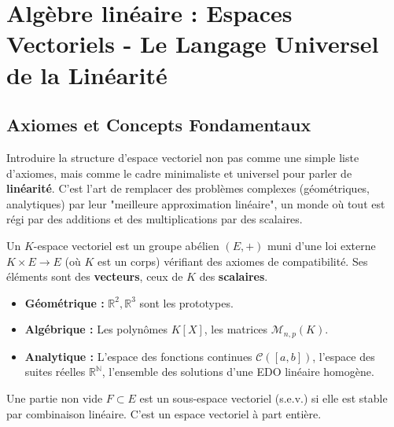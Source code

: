 \chapter{Algèbre linéaire : Espaces Vectoriels - Le Langage Universel de la Linéarité}

\section{Axiomes et Concepts Fondamentaux}

\begin{objectif}
    Introduire la structure d'espace vectoriel non pas comme une simple liste d'axiomes, mais comme le cadre minimaliste et universel pour parler de \textbf{linéarité}. C'est l'art de remplacer des problèmes complexes (géométriques, analytiques) par leur "meilleure approximation linéaire", un monde où tout est régi par des additions et des multiplications par des scalaires.
\end{objectif}

\begin{definition}
    Un $K$-espace vectoriel est un groupe abélien $(E, +)$ muni d'une loi externe $K \times E \to E$ (où $K$ est un corps) vérifiant des axiomes de compatibilité. Ses éléments sont des \textbf{vecteurs}, ceux de $K$ des \textbf{scalaires}.
\end{definition}

\begin{example}
    \begin{itemize}
        \item \textbf{Géométrique :} $\mathbb{R}^2, \mathbb{R}^3$ sont les prototypes.
        \item \textbf{Algébrique :} Les polynômes $K[X]$, les matrices $\mathcal{M}_{n,p}(K)$.
        \item \textbf{Analytique :} L'espace des fonctions continues $\mathcal{C}([a,b])$, l'espace des suites réelles $\mathbb{R}^\mathbb{N}$, l'ensemble des solutions d'une EDO linéaire homogène.
    \end{itemize}
\end{example}

\begin{definition}
    Une partie non vide $F \subset E$ est un sous-espace vectoriel (s.e.v.) si elle est stable par combinaison linéaire. C'est un espace vectoriel à part entière.
\end{definition}

